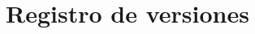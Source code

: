 \documentclass[a4paper,
	11pt,
	parskip=full,
	bibliography=totoc,
	twoside
	]{scrartcl}
\let\oldsection\section
\def\section{\cleardoubleoddpage\oldsection}
\begin{document}
\section{Registro de versiones}
\label{app:changelog}
\singlespacing
	\begin{multicols}{2}
		
	\end{multicols}
\end{document}
